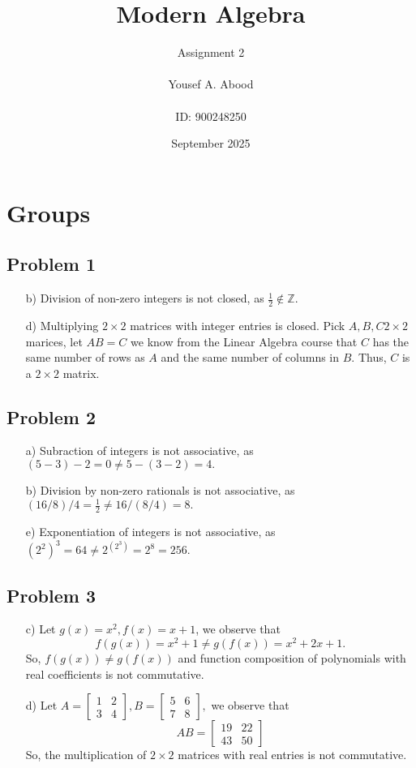 \documentclass[a4paper,12pt]{article}
\title{Modern Algebra}
\author{Assignment 2\\ \\ Yousef A. Abood\\ \\ ID: 900248250}
\date{September 2025}
\begin{document}
\maketitle
\noindent\makebox[\linewidth]{\rule{15cm}{0.4pt}}
\section{Groups}
\subsection*{Problem 1}
\begin{itemize}
    \item [b)] Division of non-zero integers is not closed, as $\frac{1}{2} \notin \mathbb{Z}.$
    \item [d)] Multiplying $2 \times 2$ matrices with integer entries is closed. Pick $A,B,C 2\times 2$ marices, let $AB=C$ we know from the Linear Algebra course that $C$ has the same number of rows as $A$ and the same number of columns in $B$. Thus, $C$ is a $2 \times 2$ matrix.
\end{itemize}
\subsection*{Problem 2}
\begin{itemize}
    \item [a)] Subraction of integers is not associative, as $(5-3)-2=0\ne 5-(3-2)=4.$
    \item [b)] Division by non-zero rationals is not associative, as $(16/8)/4=\frac{1}{2}\ne 16/(8/4)=8.$
    \item [e)] Exponentiation of integers is not associative, as $(2^2)^3=64 \ne 2^{(2^3)}=2^8=256.$
\end{itemize}
\subsection*{Problem 3}
\begin{itemize}
    \item [c)] Let $g(x)=x^2, f(x)=x+1$, we observe that \[f(g(x))=x^2+1\ne g(f(x))=x^2+2x+1.\] So, $f(g(x))\ne g(f(x))$ and function composition of polynomials with real coefficients is not commutative.
    \item [d)] Let $A=\begin{bmatrix}
      1 & 2 \\
      3 & 4
    \end{bmatrix}, B=\begin{bmatrix}
      5 & 6 \\
      7 & 8
    \end{bmatrix},$ we observe that \[AB=\begin{bmatrix}
      19 & 22  \\
      43 & 50
    \end{bmatrix}\] So, the multiplication of $2\times 2$ matrices with real entries is not commutative.
\end{itemize}
\end{document}
